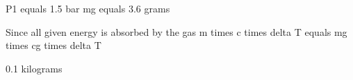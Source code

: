 P1 equals 1.5 bar  
mg equals 3.6 grams  

Since all given energy is absorbed by the gas  
m times c times delta T equals mg times cg times delta T  

0.1 kilograms
